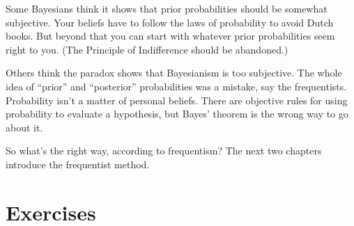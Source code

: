 \documentclass[justified]{tufte-book}
\theoremstyle{definition}
\theoremstyle{definition}
\theoremstyle{definition}
\theoremstyle{remark}
\begin{document}
Some Bayesians think it shows that prior probabilities should be somewhat subjective. Your beliefs have to follow the laws of probability to avoid Dutch books. But beyond that you can start with whatever prior probabilities seem right to you. (The Principle of Indifference should be abandoned.)

Others think the paradox shows that Bayesianism is too subjective. The whole idea of ``prior'' and ``posterior'' probabilities was a mistake, say the frequentists. Probability isn't a matter of personal beliefs. There are objective rules for using probability to evaluate a hypothesis, but Bayes' theorem is the wrong way to go about it.

So what's the right way, according to frequentism? The next two chapters introduce the frequentist method.

\hypertarget{exercises-14}{%
\section*{Exercises}\label{exercises-14}}
\end{document}
